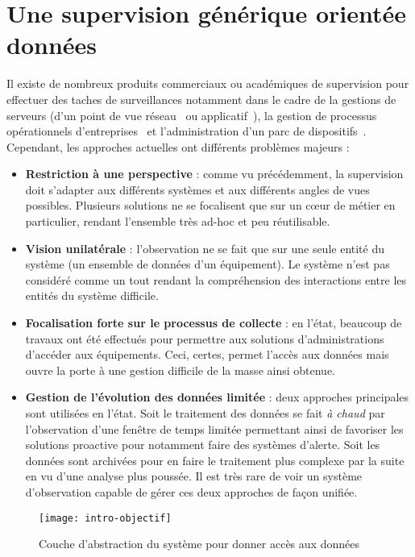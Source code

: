 \section{Une supervision générique orientée données}\label{sec:intro:objectif}
Il existe de nombreux produits commerciaux ou académiques de supervision pour effectuer des taches de surveillances notamment dans le cadre de la gestions de serveurs (d'un point de vue réseau~\cite{gestionequipreseau} ou applicatif~\cite{supervisionapache}), la gestion de processus opérationnels d'entreprises~\cite{google:businessprocesssupervision} et l'administration d'un parc de dispositifs~\cite{IETF:SNMP}. Cependant, les approches actuelles ont différents problèmes majeurs :
\begin{itemize}
    \item \textbf{Restriction à une perspective} : comme vu précédemment, la supervision doit s'adapter aux différents systèmes et aux différents angles de vues possibles. Plusieurs solutions ne se focalisent que sur un cœur de métier en particulier, rendant l'ensemble très ad-hoc et peu réutilisable.
    \item \textbf{Vision unilatérale} : l'observation ne se fait que sur une seule entité du système (un ensemble de données d'un équipement). Le système n'est pas considéré comme un tout rendant la compréhension des interactions entre les entités du système difficile.
    \item \textbf{Focalisation forte sur le processus de collecte} : en l'état, beaucoup de travaux ont été effectués pour permettre aux solutions d'administrations d'accéder aux équipements. Ceci, certes, permet l'accès aux données mais ouvre la porte à une gestion difficile de la masse ainsi obtenue.
    \item \textbf{Gestion de l'évolution des données limitée} : deux approches principales sont utilisées en l'état. Soit le traitement des données se fait \textit{à chaud} par l'observation d'une fenêtre de temps limitée permettant ainsi de favoriser les solutions proactive pour notamment faire des systèmes d'alerte. Soit les données sont archivées pour en faire le traitement plus complexe par la suite en vu d'une analyse plus poussée. Il est très rare de voir un système d'observation capable de gérer ces deux approches de façon unifiée. 
\end{itemize}

\begin{figure}
\centering
\texttt{[image: intro-objectif]}
\caption{Couche d'abstraction du système pour donner accès aux données}\label{fig:intro:objectif:abstraction}
\end{figure}


